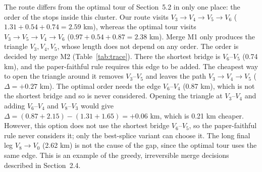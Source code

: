 The route differs from the optimal tour of Section~5.2 in only one place: the
order of the stops inside this cluster. Our route visits
$V_3 \to V_4 \to V_5 \to V_6$ ($1.31 + 0.54 + 0.74 = 2.59$ km), whereas the
optimal tour visits $V_3 \to V_5 \to V_4 \to V_6$ ($0.97 + 0.54 + 0.87 =
2.38$ km). Merge M1 only produces the triangle $V_3, V_4, V_5$, whose length
does not depend on any order. The order is decided by merge M2
(Table~\ref{tab:trace}). There the shortest bridge is $V_6$--$V_5$ (0.74 km),
and the paper-faithful rule requires this edge to be added. The cheapest way to
open the triangle around it removes $V_3$--$V_5$ and leaves the path
$V_3 \to V_4 \to V_5$ ($\Delta = +0.27$ km). The optimal order needs the edge
$V_6$--$V_4$ (0.87 km), which is not the shortest bridge and so is never
considered. Opening the triangle at $V_3$--$V_4$ and adding $V_6$--$V_4$ and
$V_8$--$V_3$ would give $\Delta = (0.87 + 2.15) - (1.31 + 1.65) = +0.06$ km,
which is 0.21 km cheaper. However, this option does not use the shortest
bridge $V_6$--$V_5$, so the paper-faithful rule never considers it; only the
best-splice variant can choose it. The long final leg $V_8 \to V_0$ (2.62 km)
is not the cause of the gap, since the optimal tour uses the same edge. This is
an example of the greedy, irreversible merge decisions described in Section~2.4.
